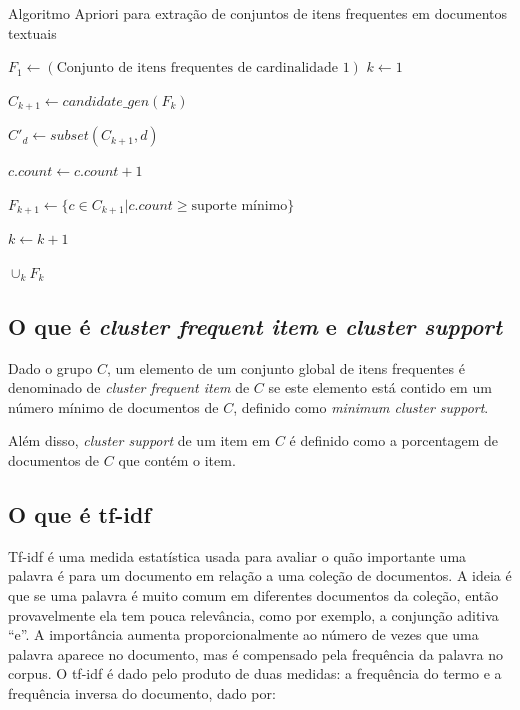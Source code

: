 \documentclass[a4paper,12pt]{article}
\begin{document}
\begin{algorithm}
\caption{Algoritmo Apriori para extração de conjuntos de itens frequentes em documentos textuais}
\label{algorithm_apriori}
\begin{algorithmic}[1]
\State $F_{1} \gets (\text{Conjunto de itens frequentes de cardinalidade 1})$
\State $k \gets 1$

	\State $C_{k+1} \gets candidate\_gen(F_{k}) $
	
		\State $C'_{d} \gets subset(C_{k+1},d)$
		
			\State $c.count \gets c.count + 1$
		\EndFor
		
	\EndFor
	
	\State $F_{k+1} \gets \{ c \in C_{k+1} | c.count \geq \text{suporte mínimo} \}$
	
	\State $k \gets k + 1$
\EndWhile

\Return $\cup_{k} F_{k}$
\end{algorithmic}
\end{algorithm}

\subsection {O que é \textit{cluster frequent item} e \textit{cluster support}}
\label {sec:cluster_frequent_item_e_cluster_support}

Dado o grupo $C$, um elemento de um conjunto global de itens frequentes é denominado de \textit{cluster frequent item} de $C$ se este elemento está contido em um número mínimo de documentos de $C$, definido como \textit{minimum cluster support}.

Além disso, \textit{cluster support} de um item em $C$ é definido como a porcentagem de documentos de $C$ que contém o item.

\subsection {O que é tf-idf}
\label {sec:tf_idf}

Tf-idf é uma medida estatística usada para avaliar o quão importante uma palavra é para um documento em relação a uma coleção de documentos. A ideia é que se uma palavra é muito comum em diferentes documentos da coleção, então provavelmente ela tem pouca relevância, como por exemplo, a conjunção aditiva “e”. A importância aumenta proporcionalmente ao número de vezes que uma palavra aparece no documento, mas é compensado pela frequência da palavra no corpus. O tf-idf é dado pelo produto de duas medidas: a frequência do termo e a frequência inversa do documento, dado por:
\end{document}
